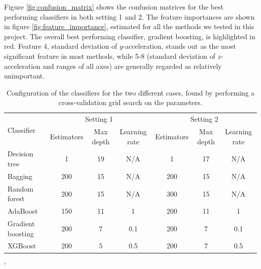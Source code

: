 Figure \ref{fig:confusion_matrix} shows the confusion matrices for the best performing classifiers in both setting 1 and 2. The feature importances are shown in figure \ref{fig:feature_importance}, estimated for all the methods we tested in this project. The overall best performing classifier, gradient boosting, is highlighted in red. Feature 4, standard deviation of $y$-acceleration, stands out as the most significant feature in most methods, while 5-8 (standard deviation of $z$-acceleration and ranges of all axes) are generally regarded as relatively unimportant.

\begin{table}[]
\caption{Configuration of the classifiers for the two different cases, found by performing a cross-validation grid search on the parameters.}
\begin{tabular}{|l|c|c|c|c|c|c|}
\hline
\multirow{2}{*}{Classifier} & \multicolumn{3}{c|}{Setting 1}            & \multicolumn{3}{c|}{Setting 2}            \\ \cline{2-7} 
                            & Estimators & Max depth & Learning rate & Estimators & Max depth & Learning rate \\ \hline
Decision tree               & 1          & 19        & N/A           & 1          &17         & N/A           \\ \hline
Bagging                     & 200        & 15        & N/A           &  200       & 15        & N/A           \\ \hline
Random forest               & 200        & 15        & N/A           &  300       & 15        & N/A           \\ \hline
AdaBoost                    & 150        &  11      & 1             &  200       &  11     &  1             \\ \hline
Gradient boosting           & 200       & 7          & 0.1             & 200       & 7    &  0.1             \\ \hline
XGBoost                     &  200      &  5        &  0.5          &  200         &  7         &   0.5            \\ \hline
\end{tabular}'
\label{tab:configuration}
\end{table}


